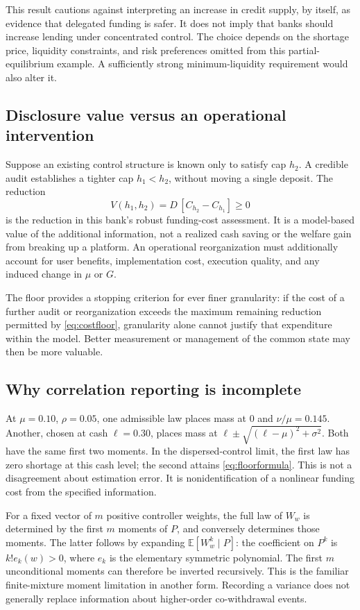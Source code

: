 \documentclass[11pt]{article}
\theoremstyle{definition}\newtheorem{definition}[theorem]{Definition}
\newcommand{\E}{\mathbb E}
\begin{document}
This result cautions against interpreting an increase in credit supply, by itself, as evidence that delegated funding is safer. It does not imply that banks should increase lending under concentrated control. The choice depends on the shortage price, liquidity constraints, and risk preferences omitted from this partial-equilibrium example. A sufficiently strong minimum-liquidity requirement would also alter it.

\subsection{Disclosure value versus an operational intervention}
Suppose an existing control structure is known only to satisfy cap \(h_2\). A credible audit establishes a tighter cap \(h_1<h_2\), without moving a single deposit. The reduction
\begin{equation}
 V(h_1,h_2)=D\,[C_{h_2}-C_{h_1}]\geq0
 \label{eq:informationvalue}
\end{equation}
is the reduction in this bank's robust funding-cost assessment. It is a model-based value of the additional information, not a realized cash saving or the welfare gain from breaking up a platform. An operational reorganization must additionally account for user benefits, implementation cost, execution quality, and any induced change in \(\mu\) or \(G\).

The floor provides a stopping criterion for ever finer granularity: if the cost of a further audit or reorganization exceeds the maximum remaining reduction permitted by \eqref{eq:costfloor}, granularity alone cannot justify that expenditure within the model. Better measurement or management of the common state may then be more valuable.

\subsection{Why correlation reporting is incomplete}
At \(\mu=0.10\), \(\rho=0.05\), one admissible law places mass at \(0\) and \(\nu/\mu=0.145\). Another, chosen at cash \(\ell=0.30\), places mass at
\(\ell\pm\sqrt{(\ell-\mu)^2+\sigma^2}\).
Both have the same first two moments. In the dispersed-control limit, the first law has zero shortage at this cash level; the second attains \eqref{eq:floorformula}. This is not a disagreement about estimation error. It is nonidentification of a nonlinear funding cost from the specified information.

For a fixed vector of \(m\) positive controller weights, the full law of \(W_w\) is determined by the first \(m\) moments of \(P\), and conversely determines those moments. The latter follows by expanding \(\E[W_w^k\mid P]\): the coefficient on \(P^k\) is \(k!e_k(w)>0\), where \(e_k\) is the elementary symmetric polynomial. The first \(m\) unconditional moments can therefore be inverted recursively. This is the familiar finite-mixture moment limitation in another form. Recording a variance does not generally replace information about higher-order co-withdrawal events.
\end{document}
